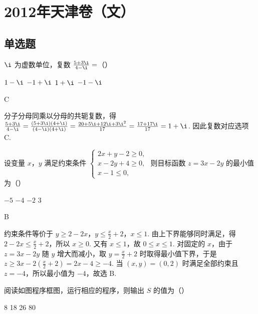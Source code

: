 \chapter{2012年天津卷（文）}

\section{单选题}

\begin{problem}
\(\i\) 为虚数单位，复数 \(\frac{5 + 3\i}{4 - \i} =\)（\quad）

\choices
    {\(1 - \i\)}
    {\(-1 + \i\)}
    {\(1 + \i\)}
    {\(-1 - \i\)}
\end{problem}

\begin{answer}
C
\end{answer}

\begin{solution}
分子分母同乘以分母的共轭复数，得 \(\frac{5+3\i}{4-\i}=\frac{(5+3\i)(4+\i)}{(4-\i)(4+\i)}=\frac{20+5\i+12\i+3\i^2}{17}=\frac{17+17\i}{17}=1+\i\). 因此复数对应选项 C.
\end{solution}

\begin{problem}
设变量 \(x\)，\(y\) 满足约束条件 \(\begin{cases}
2x + y - 2 \geqslant 0,\\
x - 2y + 4 \geqslant 0,\\
x - 1 \leqslant 0,
\end{cases}\) 则目标函数 \(z = 3x - 2y\) 的最小值为（\quad）

\choices
    {\(-5\)}
    {\(-4\)}
    {\(-2\)}
    {3}
\end{problem}

\begin{answer}
B
\end{answer}

\begin{solution}
约束条件等价于 \(y\geqslant2-2x\)，\(y\leqslant\frac{x}{2}+2\)，\(x\leqslant1\). 由上下界能够同时满足，得 \(2-2x\leqslant\frac{x}{2}+2\)，所以 \(x\geqslant0\). 又有 \(x\leqslant1\)，故 \(0\leqslant x\leqslant1\). 对固定的 \(x\)，由于 \(z=3x-2y\) 随 \(y\) 增大而减小，取 \(y=\frac{x}{2}+2\) 时取得最小值下界，于是 \(z\geqslant3x-2\left(\frac{x}{2}+2\right)=2x-4\geqslant-4\). 当 \((x,y)=(0,2)\) 时满足全部约束且 \(z=-4\)，所以最小值为 \(-4\)，故选 B.
\end{solution}

\begin{problem}
阅读如图程序框图，运行相应的程序，则输出 \(S\) 的值为（\quad）


\choices
    {8}
    {18}
    {26}
    {80}
\end{problem}


